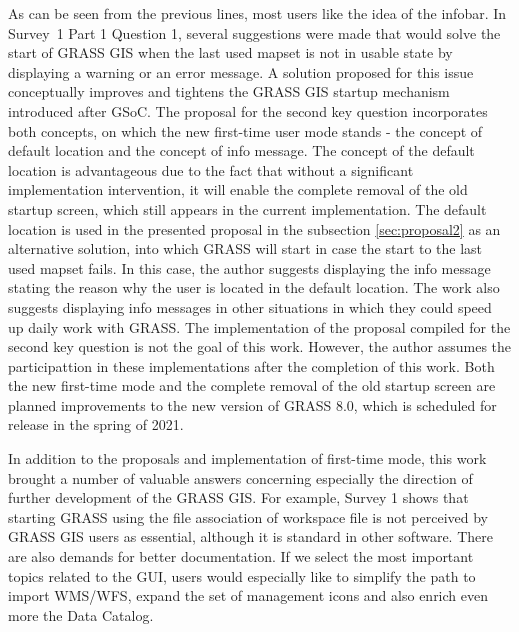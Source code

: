 \documentclass[a4paper,10pt,twoside]{article}
\begin{document}
As can be seen from the previous lines, most users like the idea of
the infobar. In Survey~1 Part 1 Question 1, several suggestions were
made that would solve the start of GRASS GIS when the last used mapset
is not in usable state by displaying a warning or an error message. A
solution proposed for this issue conceptually improves and tightens
the GRASS GIS startup mechanism introduced after GSoC. The proposal
for the second key question incorporates both concepts, on which the
new first-time user mode stands - the concept of default location and
the concept of info message. The concept of the default location is
advantageous due to the fact that without a significant implementation
intervention, it will enable the complete removal of the old startup
screen, which still appears in the current implementation. The default
location is used in the presented proposal in the subsection
\ref{sec:proposal2} as an alternative solution, into which GRASS will
start in case the start to the last used mapset fails. In this case,
the author suggests displaying the info message stating the
reason why the user is located in the default location. The work also
suggests displaying info messages in other situations in which they
could speed up daily work with GRASS.  The implementation of the 
proposal compiled for the second key question is not the goal of this work. 
However, the author assumes the participattion in these implementations 
after the completion of this work. Both the new first-time mode and the 
complete removal of the old startup screen are planned improvements to 
the new version of GRASS 8.0, which is scheduled for release in the spring of
2021.

In addition to the proposals and implementation of first-time mode,
this work brought a number of valuable answers concerning especially
the direction of further development of the GRASS GIS. For example,
Survey 1 shows that starting GRASS using the file association of
workspace file is not perceived by GRASS GIS users as essential,
although it is standard in other software. There are also demands for
better documentation. If we select the most important topics related
to the GUI, users would especially like to simplify the path to import
WMS/WFS, expand the set of management icons and also enrich even more
the Data Catalog.


\newpage
\vspace*{-6ex}
\renewcommand{\refname}{References} 
	
	
\end{document}
